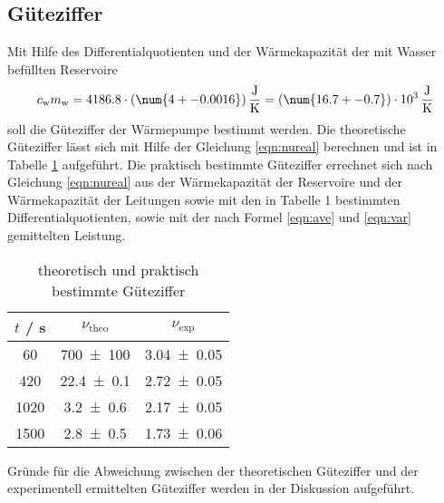 \subsection{Güteziffer}
Mit Hilfe des Differentialquotienten und der Wärmekapazität der mit Wasser befüllten Reservoire
\begin{equation}
  c_\text{w} m_\text{w} = 4186.8 \cdot (\num{4 +- 0.0016}) \, \frac{\text{J}}{\text{K}} = (\num{16.7 +- 0.7}) \cdot 10^3 \, \frac{\text{J}}{\text{K}}
  \label{eqn:WC}
\end{equation}
soll die Güteziffer der Wärmepumpe bestimmt werden. Die theoretische Güteziffer lässt sich mit Hilfe der Gleichung \ref{eqn:nureal} berechnen und ist in Tabelle \ref{tab:gueteziffer} aufgeführt. Die praktisch bestimmte Güteziffer errechnet sich nach Gleichung \ref{eqn:nureal} aus der Wärmekapazität der Reservoire und der Wärmekapazität der Leitungen sowie mit den in Tabelle 1 bestimmten Differentialquotienten, sowie mit der nach Formel \ref{eqn:ave} und \ref{eqn:var} gemittelten Leistung.
\begin{table}
  \centering
  \begin{tabular}{c c c}
    \toprule
    $t$ / s & $\nu_\text{theo}$ & $\nu_\text{exp}$ \\
    \midrule
    60	 & \num{700 +-100} 	& \num{3.04 +- 0.05} 	\\
    420  & \num{22.4 +- 0.1}	& \num{2.72 +- 0.05} 	\\
    1020 & \num{3.2 +- 0.6}	& \num{2.17 +- 0.05}	\\
    1500 & \num{2.8 +- 0.5}	& \num{1.73 +- 0.06} 	\\
    \bottomrule
  \end{tabular}
  \caption{theoretisch und praktisch bestimmte Güteziffer}
  \label{tab:gueteziffer}
\end{table}
Gründe für die Abweichung zwischen der theoretischen Güteziffer und der experimentell ermittelten Güteziffer werden in der Diskussion aufgeführt.
